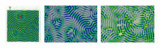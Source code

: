\begin{itemize}
\includegraphics[height=1.4cm]{python_codes/fieldstone_171/images/pear93_gamma}
\includegraphics[height=1.4cm]{python_codes/fieldstone_171/images/munafo_gamma1}
\includegraphics[height=1.4cm]{python_codes/fieldstone_171/images/munafo_gamma2}


\end{itemize}
